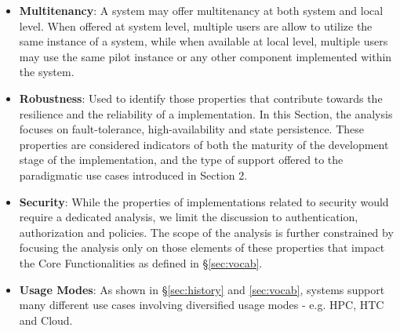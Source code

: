 \documentclass{sig-alternate}
\begin{document}
\begin{itemize}
\item \textbf{Multitenancy}: A \pilotjob system may offer multitenancy
  at both system and local level. When offered at system level,
  multiple users are allow to utilize the same instance of a \pilotjob
  system, while when available at local level, multiple users may use
  the same pilot instance or any other component implemented within the
  \pilotjob system.


\item \textbf{Robustness}: Used to identify those properties that
  contribute towards the resilience and the reliability of a \pilotjob
  implementation. In this Section, the analysis focuses on
  fault-tolerance, high-availability and state persistence. These
  properties are considered indicators of both the maturity of the
  development stage of the \pilotjob implementation, and the type of
  support offered to the paradigmatic use cases introduced in Section
  2.

\item \textbf{Security}: While the properties of \pilotjob
  implementations related to security would require a dedicated
  analysis, we limit the discussion to authentication, authorization
  and policies. The scope of the analysis is further constrained by
  focusing the analysis only on those elements of these properties
  that impact the Core Functionalities as defined in
  \S\ref{sec:vocab}.

\item \textbf{Usage Modes}: As shown in \S\ref{sec:history} and
\ref{sec:vocab}, \pilotjob systems support many different use cases involving
diversified usage modes - e.g. HPC, HTC and Cloud.




\end{itemize}
\end{document}
